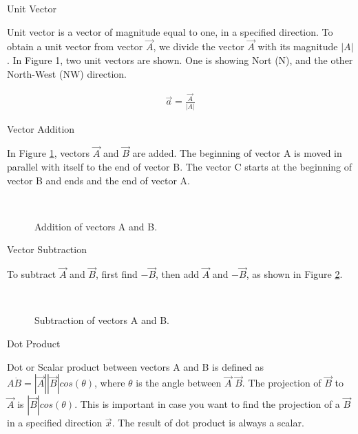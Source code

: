 \begin{description}
\item{Unit Vector} 

Unit vector is a vector of magnitude equal to one, in a specified direction. To obtain a unit vector from vector $\vec{A}$, we divide the vector $\vec{A}$ with its magnitude $|A|$. In Figure 1, two unit vectors are shown. One is showing Nort (N), and the other North-West (NW) direction. 

\begin{eqnarray}
\vec{a}=\frac{\vec{A}}{|A|}
\end{eqnarray}



\item{Vector Addition}

In Figure \ref{vectoradd}, vectors $\vec{A}$ and  $\vec{B}$ are added. The beginning of vector A is moved in parallel with itself to the end of vector B. The vector C starts at the beginning of vector B and ends and the end of vector A.

\begin{figure}[htbp]
\begin{center}
\strut{} \\
\end{center}
\caption{Addition of vectors A and B.}
\label{vectoradd}
\end{figure}




\item{Vector Subtraction}

To subtract $\vec{A}$ and $\vec{B}$, first find $-\vec{B}$, then add $\vec{A}$ and $-\vec{B}$, as shown in Figure \ref{vectorsub}.

\begin{figure}[htbp]
\begin{center}
\strut{} \\
\end{center}
\caption{Subtraction of vectors A and B.}
\label{vectorsub}
\end{figure}




\item{Dot Product}

Dot or Scalar product between vectors A and B is defined as $A \dot B = |\vec{A}| |\vec{B}| cos(\theta)$, where $\theta$ is the angle between $\vec{A}$ $\vec{B}$. The projection of $\vec{B}$ to $\vec{A}$ is $|\vec{B}| cos(\theta)$. This is important in case you want to find the projection of a $\vec{B}$ in a specified direction $\vec{x}$. The result of dot product is always a scalar.


\end{description}
